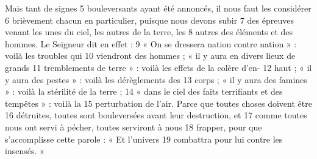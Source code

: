 Mais tant de signes	 
5	 	bouleversants ayant été annoncés, il nous faut les considérer	 
6	 	brièvement chacun en particulier, puisque nous devons subir	 
7	 	des épreuves venant les unes du ciel, les autres de la terre, les	 
8	 	autres des éléments et des hommes. Le Seigneur dit en effet :	 
9	 	« On se dressera nation contre nation » : voilà les troubles qui	 
10	 	viendront des hommes ; « il y aura en divers lieux de grands	 
11	 	tremblements de terre » : voilà les effets de la colère d'en-	 
12	 	haut ; « il y aura des pestes » : voilà les dérèglements des	 
13	 	corps ; « il y aura des famines » : voilà la stérilité de la terre ;	 
14	 	« dans le ciel des faits terrifiants et des tempêtes » : voilà la	 
15	 	perturbation de l'air. Parce que toutes choses doivent être	 
16	 	détruites, toutes sont bouleversées avant leur destruction, et	 
17	 	comme toutes nous ont servi à pécher, toutes serviront à nous	 
18	 	frapper, pour que s'accomplisse cette parole : « Et l'univers	 
19	 	combattra pour lui contre les insensés. »